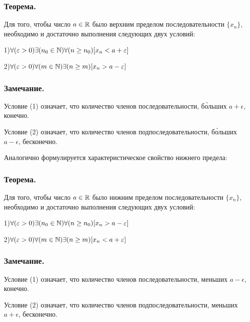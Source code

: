 \subsubsection{Теорема.}

Для того, чтобы число $a \in \mathbb{R}$ было верхним пределом последовательности $\{x_n\}$, необходимо и достаточно выполнения следующих двух условий:

1)$\forall(\varepsilon >0 )\exists(n_0 \in \mathbb{N})\forall(n \geq n_0)[x_n < a + \varepsilon]$

2)$\forall(\varepsilon > 0)\forall(m   \in \mathbb{N})\exists(n \geq m  )[x_n > a - \varepsilon]$

\subsubsection{Замечание.}
Условие (1) означает, что количество членов последовательности, б\`{о}льших $a+\epsilon$, конечно.

Условие (2) означает, что количество членов подпоследовательности, б\`{о}льших $a-\epsilon$, бесконечно.

\par

Аналогично формулируется характеристическое свойство нижнего предела:

\subsubsection{Теорема.}

Для того, чтобы число $a \in \mathbb{R}$ было нижним пределом последовательности $\{x_n\}$, необходимо и достаточно выполнения следующих двух условий:

1)$\forall(\varepsilon >0 )\exists(n_0 \in \mathbb{N})\forall(n \geq n_0)[x_n > a - \varepsilon]$

2)$\forall(\varepsilon > 0)\forall(m   \in \mathbb{N})\exists(n \geq m  )[x_n < a + \varepsilon]$

\subsubsection{Замечание.}
Условие (1) означает, что количество членов последовательности, меньших $a-\epsilon$, конечно.

Условие (2) означает, что количество членов подпоследовательности, меньших $a+\epsilon$, бесконечно.


